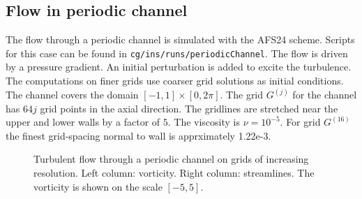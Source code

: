 \subsection{Flow in periodic channel}\label{sec:channelFlow}

The flow through a periodic channel is simulated with the AFS24 scheme.
Scripts for this case can be found in {\tt cg/ins/runs/periodicChannel}. 
The flow is driven by a pressure gradient. An initial perturbation is
added to excite the turbulence. The computations on finer
grids use coarser grid solutions as initial conditions.
The channel covers the domain $[-1,1]\times[0,2\pi]$. 
The grid $G^{(j)}$ for the channel has $64 j$ grid points in the axial direction. The gridlines
are stretched near the upper and lower walls by a factor of $5$. The viscosity is $\nu=10^{-5}$. 
For grid $G^{(16)}$ the finest grid-spacing normal to wall is apprximately 1.22e-3. 

{
\begin{figure}[hbt]
\newcommand{\figWidtha}{8.5cm}
\newcommand{\trimfig}[2]{\trimFig{#1}{#2}{0}{.21}{.45}{.40}}
\begin{center}
\end{center}
\caption{Turbulent flow through a periodic channel on grids of increasing resolution. Left column: vorticity.
    Right column: streamlines. The vorticity is shown on the scale $[-5,5]$.} 
\label{fig:periodicChannelFlow}
\end{figure}
}


